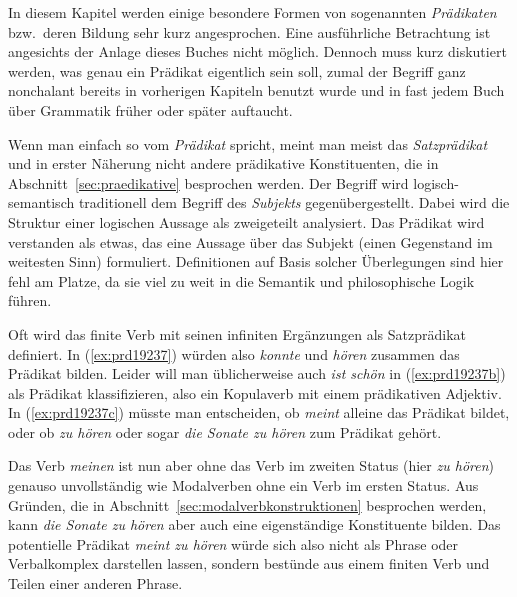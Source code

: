 In diesem Kapitel werden einige besondere Formen von sogenannten \textit{Prädikaten} bzw.\ deren Bildung sehr kurz angesprochen.
Eine ausführliche Betrachtung ist angesichts der Anlage dieses Buches nicht möglich.
Dennoch muss kurz diskutiert werden, was genau ein Prädikat eigentlich sein soll, zumal der Begriff ganz nonchalant bereits in vorherigen Kapiteln benutzt wurde und in fast jedem Buch über Grammatik früher oder später auftaucht.


Wenn man einfach so vom \textit{Prädikat} spricht, meint man meist das \textit{Satzprädikat} und in erster Näherung nicht andere prädikative Konstituenten, die in Abschnitt~\ref{sec:praedikative} besprochen werden.
Der Begriff wird logisch-semantisch traditionell dem Begriff des \textit{Subjekts} gegenübergestellt.
Dabei wird die Struktur einer logischen Aussage als zweigeteilt analysiert.
Das Prädikat wird verstanden als etwas, das eine Aussage über das Subjekt (einen Gegenstand im weitesten Sinn) formuliert.
Definitionen auf Basis solcher Überlegungen sind hier fehl am Platze, da sie viel zu weit in die Semantik und philosophische Logik führen.

Oft wird das finite Verb mit seinen infiniten Ergänzungen als Satzprädikat definiert.
In (\ref{ex:prd19237}) würden also \textit{konnte} und \textit{hören} zusammen das Prädikat bilden.
Leider will man üblicherweise auch \textit{ist schön} in (\ref{ex:prd19237b}) als Prädikat klassifizieren, also ein Kopulaverb mit einem prädikativen Adjektiv.
In (\ref{ex:prd19237c}) müsste man entscheiden, ob \textit{meint} alleine das Prädikat bildet, oder ob \textit{zu hören} oder sogar \textit{die Sonate zu hören} zum Prädikat gehört.

\begin{exe}
  \ex\label{ex:prd19237} 
  \begin{xlist}
  \end{xlist}
\end{exe}

Das Verb \textit{meinen} ist nun aber ohne das Verb im zweiten Status (hier \textit{zu hören}) genauso unvollständig wie Modalverben ohne ein Verb im ersten Status.
Aus Gründen, die in Abschnitt~\ref{sec:modalverbkonstruktionen} besprochen werden, kann \textit{die Sonate zu hören} aber auch eine eigenständige Konstituente bilden.
Das potentielle Prädikat \textit{meint zu hören} würde sich also nicht als Phrase oder Verbalkomplex darstellen lassen, sondern bestünde aus einem finiten Verb und Teilen einer anderen Phrase.

